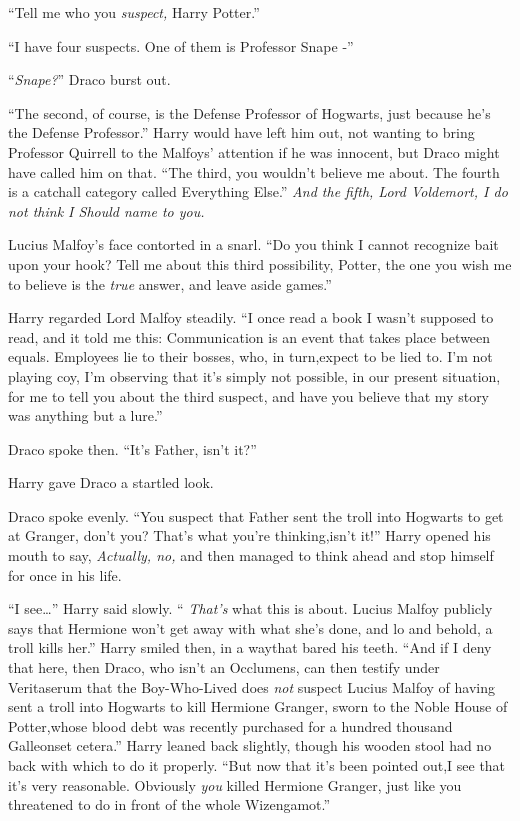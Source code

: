 ``Tell me who you \emph{suspect,} Harry Potter.''

``I have four suspects. One of them is Professor Snape -''

``\emph{Snape?}'' Draco burst out.

``The second, of course, is the Defense Professor of Hogwarts, just because he's the Defense Professor.'' Harry would have left him out, not wanting to bring Professor Quirrell to the Malfoys' attention if he was innocent, but Draco might have called him on that. ``The third, you wouldn't believe me about. The fourth is a catchall category called Everything Else.'' \emph{And the fifth, Lord Voldemort, I do not think I Should name to you.}

Lucius Malfoy's face contorted in a snarl. ``Do you think I cannot recognize bait upon your hook? Tell me about this third possibility, Potter, the one you wish me to believe is the \emph{true} answer, and leave aside games.''

Harry regarded Lord Malfoy steadily. ``I once read a book I wasn't supposed to read, and it told me this: Communication is an event that takes place between equals. Employees lie to their bosses, who, in turn,expect to be lied to. I'm not playing coy, I'm observing that it's simply not possible, in our present situation, for me to tell you about the third suspect, and have you believe that my story was anything but a lure.''

Draco spoke then. ``It's Father, isn't it?''

Harry gave Draco a startled look.

Draco spoke evenly. ``You suspect that Father sent the troll into Hogwarts to get at Granger, don't you? That's what you're thinking,isn't it!''
Harry opened his mouth to say, \emph{Actually, no,} and then managed to think ahead and stop himself for once in his life.

``I see\ldots{}'' Harry said slowly. `` \emph{That's} what this is about. Lucius Malfoy publicly says that Hermione won't get away with what she's done, and lo and behold, a troll kills her.'' Harry smiled then, in a waythat bared his teeth. ``And if I deny that here, then Draco, who isn't an Occlumens, can then testify under Veritaserum that the Boy-Who-Lived does \emph{not} suspect Lucius Malfoy of having sent a troll into Hogwarts to kill Hermione Granger, sworn to the Noble House of Potter,whose blood debt was recently purchased for a hundred thousand Galleonset cetera.'' Harry leaned back slightly, though his wooden stool had no back with which to do it properly. ``But now that it's been pointed out,I see that it's very reasonable. Obviously \emph{you} killed Hermione Granger, just like you threatened to do in front of the whole Wizengamot.''


